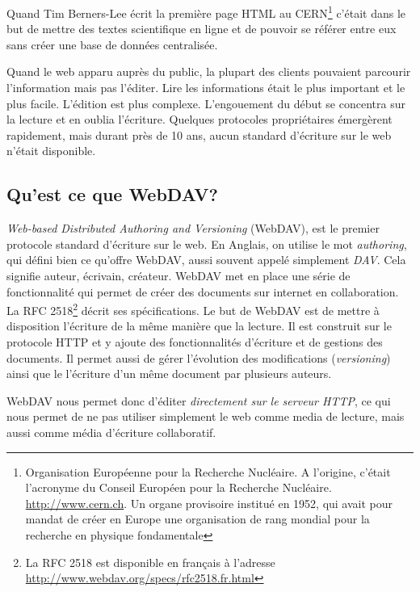 \documentclass[a4paper, 11pt]{article}
\begin{document}
	Quand Tim Berners-Lee écrit la première page HTML au CERN\footnote{Organisation Européenne pour la Recherche Nucléaire. A l'origine, c'était l'acronyme du Conseil Européen pour la Recherche Nucléaire. \url{http://www.cern.ch}. Un organe provisoire institué en 1952, qui avait pour mandat de créer en Europe une organisation de rang mondial pour la recherche en physique fondamentale} c'était dans le but de mettre des textes scientifique en ligne et de pouvoir se référer entre eux sans créer une base de données centralisée. %
	
	Quand le web apparu auprès du public, la plupart des clients pouvaient parcourir l'information mais pas l'éditer. Lire les informations était le plus important et le plus facile. L'édition est plus complexe. L'engouement du début se concentra sur la lecture et en oublia l'écriture. Quelques protocoles propriétaires émergèrent rapidement, mais durant près de 10 ans, aucun standard d'écriture sur le web n'était disponible. 
	
	\subsection{Qu'est ce que WebDAV?}
	
		\emph{Web-based Distributed Authoring and Versioning} (WebDAV), est le premier protocole standard d'écriture sur le web. En Anglais, on utilise le mot \emph{authoring}, qui défini bien ce qu'offre WebDAV, aussi souvent appelé simplement \emph{DAV}. Cela signifie auteur, écrivain, créateur. WebDAV met en place une série de fonctionnalité qui permet de créer des documents sur internet en collaboration. La RFC 2518\footnote{La RFC 2518 est disponible en français à l'adresse \url{http://www.webdav.org/specs/rfc2518.fr.html}} décrit ses spécifications. Le but de WebDAV est de mettre à disposition l'écriture de la même manière que la lecture. Il est construit sur le protocole HTTP et y ajoute des fonctionnalités d'écriture et de gestions des documents. Il permet aussi de gérer l'évolution des modifications (\emph{versioning}) ainsi que le l'écriture d'un même document par plusieurs auteurs.
		
		WebDAV nous permet donc d'éditer \emph{directement sur le serveur HTTP}, ce qui nous permet de ne pas utiliser simplement le web comme media de lecture, mais aussi comme média d'écriture collaboratif. 
		
		
		
		
\end{document}
